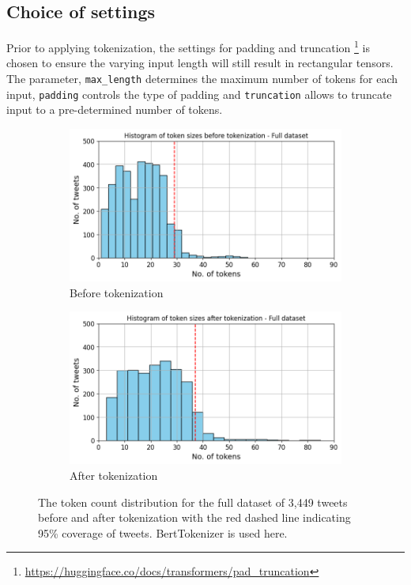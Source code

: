 \subsection{Choice of settings}
Prior to applying tokenization, the settings for padding and truncation \footnote{\url{https://huggingface.co/docs/transformers/pad_truncation}} is chosen to ensure the varying input length will still result in rectangular tensors. The parameter, \texttt{max\_length} determines the maximum number of tokens for each input, \texttt{padding} controls the type of padding and \texttt{truncation} allows to truncate input to a pre-determined number of tokens.\newline

\begin{figure}[htbp]
    \centering
    \captionsetup{font=small}
    \begin{subfigure}[b]{0.48\textwidth}
        \includegraphics[width=\textwidth]{figures/token_hist.png}
        \caption{Before tokenization}
        \label{fig: token_hist}
    \end{subfigure}
    \hfill
    \begin{subfigure}[b]{0.48\textwidth}
        \includegraphics[width=\textwidth]{figures/token_pp_hist.png}
        \caption{After tokenization}
        \label{fig: token_pp_hist}
    \end{subfigure}
    \caption{The token count distribution for the full dataset of 3,449 tweets before and after tokenization with the red dashed line indicating 95\% coverage of tweets. BertTokenizer is used here.}
    \label{fig: bef_aft_token}
\end{figure}

